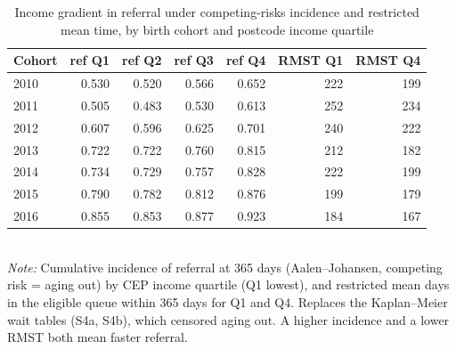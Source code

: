 \begin{table}[htbp]\centering
\caption{Income gradient in referral under competing-risks incidence and restricted mean time, by birth cohort and postcode income quartile}
\label{tab:E2}
\footnotesize
\setlength{\tabcolsep}{4pt}
\begin{tabular}{lrrrrrr}
\toprule
Cohort & ref Q1 & ref Q2 & ref Q3 & ref Q4 & RMST Q1 & RMST Q4 \\
\midrule
2010 & 0.530 & 0.520 & 0.566 & 0.652 & 222 & 199 \\
2011 & 0.505 & 0.483 & 0.530 & 0.613 & 252 & 234 \\
2012 & 0.607 & 0.596 & 0.625 & 0.701 & 240 & 222 \\
2013 & 0.722 & 0.722 & 0.760 & 0.815 & 212 & 182 \\
2014 & 0.734 & 0.729 & 0.757 & 0.828 & 222 & 199 \\
2015 & 0.790 & 0.782 & 0.812 & 0.876 & 199 & 179 \\
2016 & 0.855 & 0.853 & 0.877 & 0.923 & 184 & 167 \\
\bottomrule
\end{tabular}
\\[3pt]{\footnotesize \textit{Note:} Cumulative incidence of referral at 365 days (Aalen--Johansen, competing risk = aging out) by CEP income quartile (Q1 lowest), and restricted mean days in the eligible queue within 365 days for Q1 and Q4. Replaces the Kaplan--Meier wait tables (S4a, S4b), which censored aging out. A higher incidence and a lower RMST both mean faster referral.}
\end{table}
